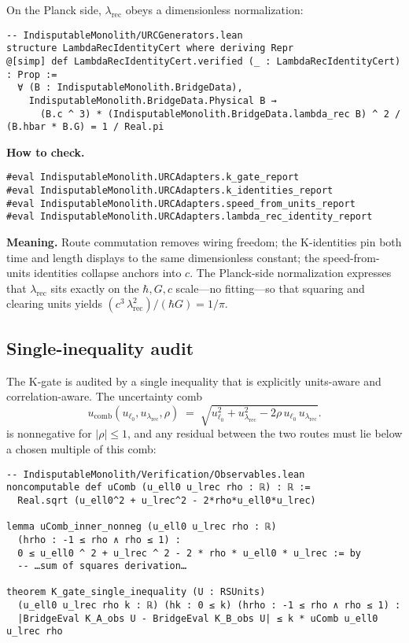 \documentclass[11pt,a4paper,twoside]{article}
\numberwithin{equation}{section}
\theoremstyle{customthm}
\theoremstyle{customdef}
\theoremstyle{customrem}
\begin{document}
On the Planck side, \(\lambda_{\mathrm{rec}}\) obeys a dimensionless normalization:
\begin{lstlisting}
-- IndisputableMonolith/URCGenerators.lean
structure LambdaRecIdentityCert where deriving Repr
@[simp] def LambdaRecIdentityCert.verified (_ : LambdaRecIdentityCert) : Prop :=
  ∀ (B : IndisputableMonolith.BridgeData),
    IndisputableMonolith.BridgeData.Physical B →
      (B.c ^ 3) * (IndisputableMonolith.BridgeData.lambda_rec B) ^ 2 / (B.hbar * B.G) = 1 / Real.pi
\end{lstlisting}

\noindent \textbf{How to check.}
\begin{lstlisting}
#eval IndisputableMonolith.URCAdapters.k_gate_report
#eval IndisputableMonolith.URCAdapters.k_identities_report
#eval IndisputableMonolith.URCAdapters.speed_from_units_report
#eval IndisputableMonolith.URCAdapters.lambda_rec_identity_report
\end{lstlisting}

\noindent \textbf{Meaning.} Route commutation removes wiring freedom; the K-identities pin both time and length displays to the same dimensionless constant; the speed-from-units identities collapse anchors into \(c\). The Planck-side normalization expresses that \(\lambda_{\mathrm{rec}}\) sits exactly on the \(\hbar,G,c\) scale—no fitting—so that squaring and clearing units yields \((c^3\,\lambda_{\mathrm{rec}}^2)/(\hbar G)=1/\pi\).

\subsection{Single-inequality audit}\label{subsec:audit-single}

The K-gate is audited by a single inequality that is explicitly units-aware and correlation-aware. The uncertainty comb
\[
u_{\mathrm{comb}}(u_{\ell_0},u_{\lambda_{\mathrm{rec}}},\rho)
\;=\; \sqrt{u_{\ell_0}^2 + u_{\lambda_{\mathrm{rec}}}^2 - 2\rho\,u_{\ell_0}\,u_{\lambda_{\mathrm{rec}}}}.
\]
is nonnegative for \(|\rho|\le 1\), and any residual between the two routes must lie below a chosen multiple of this comb:
\begin{lstlisting}
-- IndisputableMonolith/Verification/Observables.lean
noncomputable def uComb (u_ell0 u_lrec rho : ℝ) : ℝ :=
  Real.sqrt (u_ell0^2 + u_lrec^2 - 2*rho*u_ell0*u_lrec)

lemma uComb_inner_nonneg (u_ell0 u_lrec rho : ℝ)
  (hrho : -1 ≤ rho ∧ rho ≤ 1) :
  0 ≤ u_ell0 ^ 2 + u_lrec ^ 2 - 2 * rho * u_ell0 * u_lrec := by
  -- …sum of squares derivation…

theorem K_gate_single_inequality (U : RSUnits)
  (u_ell0 u_lrec rho k : ℝ) (hk : 0 ≤ k) (hrho : -1 ≤ rho ∧ rho ≤ 1) :
  |BridgeEval K_A_obs U - BridgeEval K_B_obs U| ≤ k * uComb u_ell0 u_lrec rho
\end{lstlisting}
\end{document}
